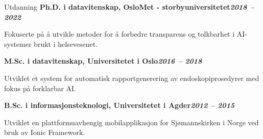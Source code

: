 \begin{rubric}{Utdanning}
\entry*[]%
\textbf{Ph.D. i datavitenskap, OsloMet - storbyuniversitetet\hfill\textit{2018 -- 2022}} \par
\begin{compactitem}
    \item Fokuserte på å utvikle metoder for å forbedre transparens og tolkbarhet i AI-systemer brukt i helsevesenet.
    \vspace{-12pt}
\end{compactitem}
%
\entry*[]%
\textbf{M.Sc. i datavitenskap, Universitetet i Oslo\hfill\textit{2016 -- 2018}} \par
\begin{compactitem}
    \item Utviklet et system for automatisk rapportgenerering av endoskopiprosedyrer med fokus på forklarbar AI.
    \vspace{-12pt}
\end{compactitem}
% 
\entry*[]%
\textbf{B.Sc. i informasjonsteknologi, Universitetet i Agder\hfill\textit{2012 -- 2015}} \par
\begin{compactitem}
\item Utviklet en plattformuavhengig mobilapplikasjon for Sjømannskirken i Norge ved bruk av Ionic Framework.
\end{compactitem}
\end{rubric}
